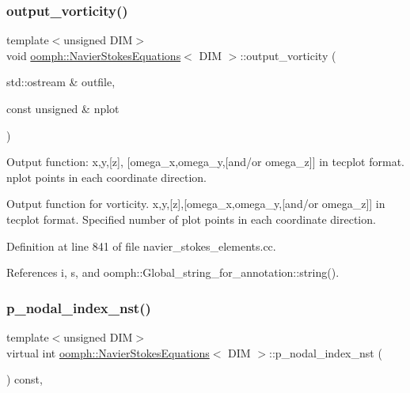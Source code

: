 \subsubsection{\texorpdfstring{output\+\_\+vorticity()}{output\_vorticity()}}
{\footnotesize\ttfamily template$<$unsigned D\+IM$>$ \\
void \hyperlink{classoomph_1_1NavierStokesEquations}{oomph\+::\+Navier\+Stokes\+Equations}$<$ D\+IM $>$\+::output\+\_\+vorticity (\begin{DoxyParamCaption}\item[{std\+::ostream \&}]{outfile,  }\item[{const unsigned \&}]{nplot }\end{DoxyParamCaption})}



Output function\+: x,y,\mbox{[}z\mbox{]}, \mbox{[}omega\+\_\+x,omega\+\_\+y,\mbox{[}and/or omega\+\_\+z\mbox{]}\mbox{]} in tecplot format. nplot points in each coordinate direction. 

Output function for vorticity. x,y,\mbox{[}z\mbox{]},\mbox{[}omega\+\_\+x,omega\+\_\+y,\mbox{[}and/or omega\+\_\+z\mbox{]}\mbox{]} in tecplot format. Specified number of plot points in each coordinate direction. 

Definition at line 841 of file navier\+\_\+stokes\+\_\+elements.\+cc.



References i, s, and oomph\+::\+Global\+\_\+string\+\_\+for\+\_\+annotation\+::string().

\mbox{\label{classoomph_1_1NavierStokesEquations_a3694d3e2f09259cfda71547259f031ed}} 
\subsubsection{\texorpdfstring{p\+\_\+nodal\+\_\+index\+\_\+nst()}{p\_nodal\_index\_nst()}}
{\footnotesize\ttfamily template$<$unsigned D\+IM$>$ \\
virtual int \hyperlink{classoomph_1_1NavierStokesEquations}{oomph\+::\+Navier\+Stokes\+Equations}$<$ D\+IM $>$\+::p\+\_\+nodal\+\_\+index\+\_\+nst (\begin{DoxyParamCaption}{ }\end{DoxyParamCaption}) const\hspace{0.3cm}{\ttfamily [inline]}, {\ttfamily [virtual]}}



